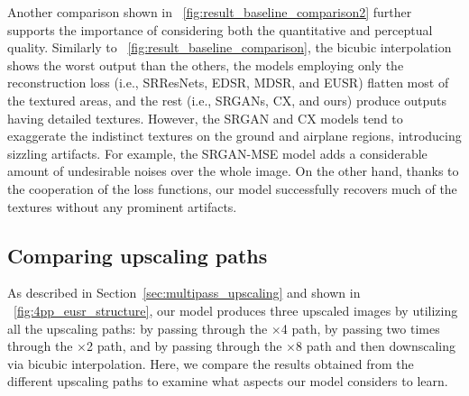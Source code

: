 \documentclass[runningheads]{llncs}
\begin{document}
Another comparison shown in \figurename~\ref{fig:result_baseline_comparison2} further supports the importance of considering both the quantitative and perceptual quality.
Similarly to \figurename~\ref{fig:result_baseline_comparison}, the bicubic interpolation shows the worst output than the others, the models employing only the reconstruction loss (i.e., SRResNets, EDSR, MDSR, and EUSR) flatten most of the textured areas, and the rest (i.e., SRGANs, CX, and ours) produce outputs having detailed textures.
However, the SRGAN and CX models tend to exaggerate the indistinct textures on the ground and airplane regions, introducing sizzling artifacts.
For example, the SRGAN-MSE model adds a considerable amount of undesirable noises over the whole image.
On the other hand, thanks to the cooperation of the loss functions, our model successfully recovers much of the textures without any prominent artifacts.

\subsection{Comparing upscaling paths}

As described in Section~\ref{sec:multipass_upscaling} and shown in \figurename~\ref{fig:4pp_eusr_structure}, our model produces three upscaled images by utilizing all the upscaling paths: by passing through the $\times$4 path, by passing two times through the $\times$2 path, and by passing through the $\times$8 path and then downscaling via bicubic interpolation.
Here, we compare the results obtained from the different upscaling paths to examine what aspects our model considers to learn.
\end{document}
